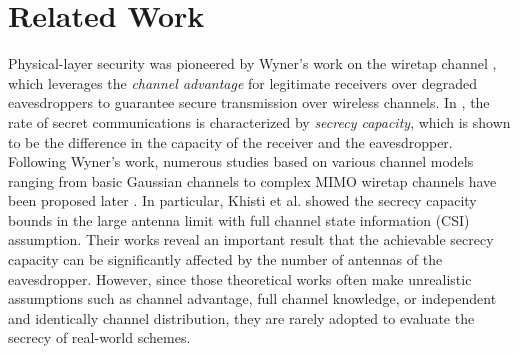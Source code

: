 \section{Related Work}


Physical-layer security was pioneered by Wyner's work on the wiretap channel \cite{wyner1975wire}, which leverages the \textit{channel advantage} for legitimate receivers over degraded eavesdroppers to guarantee secure transmission over wireless channels. 
In \cite{wyner1975wire}, the rate of secret communications is characterized by \textit{secrecy capacity}, which is shown to be the difference in the capacity of the receiver and the eavesdropper. Following Wyner's work, numerous studies based on various channel models ranging from basic Gaussian channels to complex MIMO wiretap channels have been proposed later \cite{csiszar1978broadcast,leung1978gaussian,parada2005secrecy,li2007secret,gopala2008secrecy,KhistiSecureTransmissionMultiple2010,KhistiSecureTransmissionMultiple2010a}. In particular, Khisti et al. \cite{KhistiSecureTransmissionMultiple2010,KhistiSecureTransmissionMultiple2010a}
showed the secrecy capacity bounds in the large antenna limit with full channel state information (CSI) assumption. Their works reveal an important result   that the achievable secrecy capacity can be significantly affected by the number of antennas of the eavesdropper. 
However, since those theoretical works often make unrealistic assumptions such as channel advantage, full channel knowledge, or independent and identically channel distribution, they are rarely adopted to evaluate the secrecy of real-world schemes.

